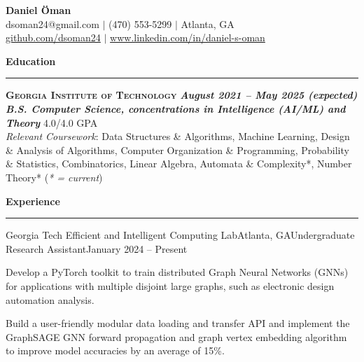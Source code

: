 \documentclass{article}
\newcommand{\horizontal}{\vspace{2pt}\hrule}
\newcommand{\school}[3]{\vspace{2pt}\textsc{\textbf{#1}} \hfill \textbf{\textit{#2}} \\ #3}
\newcommand{\sectitle}[1]{\vspace{3pt} \textbf{\large #1} \horizontal}
\begin{document}
\thispagestyle{empty}
\begin{center}
    \textbf{\LARGE Daniel Öman} \\
    dsoman24@gmail.com $|$ (470) 553-5299 $|$ Atlanta, GA \\
    \href{https://github.com/dsoman24}{github.com/dsoman24} $|$ \href{https://www.linkedin.com/in/daniel-s-oman/}{www.linkedin.com/in/daniel-s-oman}
\end{center}

\begin{flushleft}
\sectitle{Education}

\school{Georgia Institute of Technology}{August 2021 -- May 2025 (expected)}
{\textbf{\textit{B.S. Computer Science, concentrations in Intelligence (AI/ML) and Theory}} \hfill 4.0/4.0 GPA \\ \textit{Relevant Coursework}: Data Structures \& Algorithms, Machine Learning, Design \& Analysis of Algorithms, Computer Organization \& Programming, Probability \& Statistics, Combinatorics, Linear Algebra, Automata \& Complexity*, Number Theory* (\textit{* = current})}

\sectitle{Experience}

    \begin{experience}{Georgia Tech Efficient and Intelligent Computing Lab}{Atlanta, GA}{Undergraduate Research Assistant}{January 2024 -- Present}
        \item Develop a PyTorch toolkit to train distributed Graph Neural Networks (GNNs) for applications with multiple disjoint large graphs, such as electronic design automation analysis.
        \item Build a user-friendly modular data loading and transfer API and implement the GraphSAGE GNN forward propagation and graph vertex embedding algorithm to improve model accuracies by an average of 15\%.
    \end{experience}


\end{flushleft}
\end{document}
